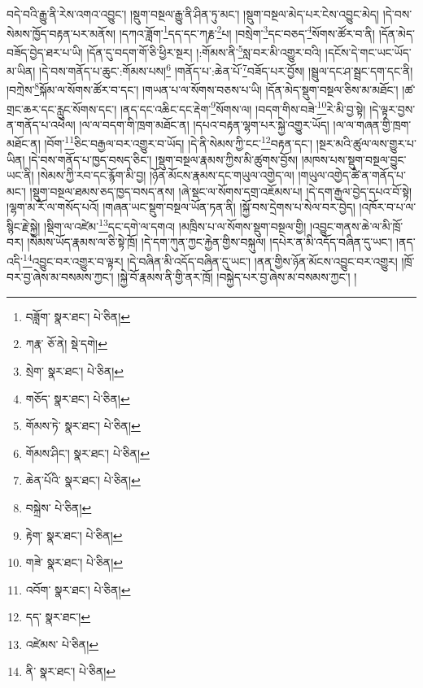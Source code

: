 བདེ་བའི་རྒྱུ་ནི་རེས་འགའ་འབྱུང་། །སྡུག་བསྔལ་རྒྱུ་ནི་ཤིན་ཏུ་མང་། །སྡུག་བསྔལ་མེད་པར་ངེས་འབྱུང་མེད། །དེ་བས་སེམས་ཁྱོད་བརྟན་པར་མནོས། །དཀའ་ཟློག་\footnote{བཟློག་  སྣར་ཐང་།  པེ་ཅིན། }དད་དང་ཀརྞ་\footnote{ཀརྣ་  ཅོ་ནེ།  སྡེ་དགེ། }པ། །བསྲེག་\footnote{སྲེག་  སྣར་ཐང་།  པེ་ཅིན། }དང་བཅད་\footnote{གཅོད་  སྣར་ཐང་།  པེ་ཅིན། }སོགས་ཚོར་བ་ནི། །དོན་མེད་བཟོད་བྱེད་ཐར་པ་ཡི། །དོན་དུ་བདག་གོ་ཅི་ཕྱིར་སྔར། །:གོམས་ནི་\footnote{གོམས་ཏེ་  སྣར་ཐང་།  པེ་ཅིན། }སླ་བར་མི་འགྱུར་བའི། །དངོས་དེ་གང་ཡང་ཡོད་མ་ཡིན། །དེ་བས་གནོད་པ་ཆུང་:གོམས་པས།\footnote{གོམས་ཤིང་།  སྣར་ཐང་།  པེ་ཅིན། } །གནོད་པ་:ཆེན་པོ་\footnote{ཆེན་པོའི་  སྣར་ཐང་།  པེ་ཅིན། }བཟོད་པར་བྱོས། །སྦྲུལ་དང་ཤ་སྦྲང་དག་དང་ནི། །བཀྲེས་\footnote{བསྐྲེས་  པེ་ཅིན། }སྐོམ་ལ་སོགས་ཚོར་བ་དང་། །གཡན་པ་ལ་སོགས་བཅས་པ་ཡི། །དོན་མེད་སྡུག་བསྔལ་ཅིས་མ་མཐོང་། །ཚ་གྲང་ཆར་དང་རླུང་སོགས་དང་། །ནད་དང་འཆིང་དང་རྡེག་\footnote{རྟེག་  སྣར་ཐང་།  པེ་ཅིན། }སོགས་ལ། །བདག་གིས་བཟེ་\footnote{གཟེ་  སྣར་ཐང་།  པེ་ཅིན། }རེ་མི་བྱ་སྟེ། །དེ་ལྟར་བྱས་ན་གནོད་པ་འཕེལ། །ལ་ལ་བདག་གི་ཁྲག་མཐོང་ན། །དཔའ་བརྟན་ལྷག་པར་སྐྱེ་འགྱུར་ཡོད། །ལ་ལ་གཞན་གྱི་ཁྲག་མཐོང་ན། །བོག་\footnote{འབོག་  སྣར་ཐང་།  པེ་ཅིན། }ཅིང་བརྒྱལ་བར་འགྱུར་བ་ཡོད། །དེ་ནི་སེམས་ཀྱི་ངང་\footnote{དད་  སྣར་ཐང་། }བརྟན་དང་། །སྔར་མའི་ཚུལ་ལས་གྱུར་པ་ཡིན། །དེ་བས་གནོད་པ་ཁྱད་བསད་ཅིང་། །སྡུག་བསྔལ་རྣམས་ཀྱིས་མི་ཚུགས་བྱོས། །མཁས་པས་སྡུག་བསྔལ་བྱུང་ཡང་ནི། །སེམས་ཀྱི་རབ་དང་རྙོག་མི་བྱ། །ཉོན་མོངས་རྣམས་དང་གཡུལ་འགྱེད་ལ། །གཡུལ་འགྱེད་ཚེ་ན་གནོད་པ་མང་། །སྡུག་བསྔལ་ཐམས་ཅད་ཁྱད་བསད་ནས། །ཞེ་སྡང་ལ་སོགས་དགྲ་འཇོམས་པ། །དེ་དག་རྒྱལ་བྱེད་དཔའ་བོ་སྟེ། །ལྷག་མ་རོ་ལ་གསོད་པའོ། །གཞན་ཡང་སྡུག་བསྔལ་ཡོན་ཏན་ནི། །སྐྱོ་བས་དྲེགས་པ་སེལ་བར་བྱེད། །འཁོར་བ་པ་ལ་སྙིང་རྗེ་སྐྱེ། །སྡིག་ལ་འཛེམ་\footnote{འཛེམས་  པེ་ཅིན། }དང་དགེ་ལ་དགའ། །མཁྲིས་པ་ལ་སོགས་སྡུག་བསྔལ་གྱི། །འབྱུང་གནས་ཆེ་ལ་མི་ཁྲོ་བར། །སེམས་ཡོད་རྣམས་ལ་ཅི་སྟེ་ཁྲོ། །དེ་དག་ཀུན་ཀྱང་རྐྱེན་གྱིས་བསྐུལ། །དཔེར་ན་མི་འདོད་བཞིན་དུ་ཡང་། །ནད་འདི་\footnote{ནི་  སྣར་ཐང་།  པེ་ཅིན། }འབྱུང་བར་འགྱུར་བ་ལྟར། །དེ་བཞིན་མི་འདོད་བཞིན་དུ་ཡང་། །ནན་གྱིས་ཉོན་མོངས་འབྱུང་བར་འགྱུར། །ཁྲོ་བར་བྱ་ཞེས་མ་བསམས་ཀྱང་། །སྐྱེ་བོ་རྣམས་ནི་གྱི་ནར་ཁྲོ། །བསྐྱེད་པར་བྱ་ཞེས་མ་བསམས་ཀྱང་། །
